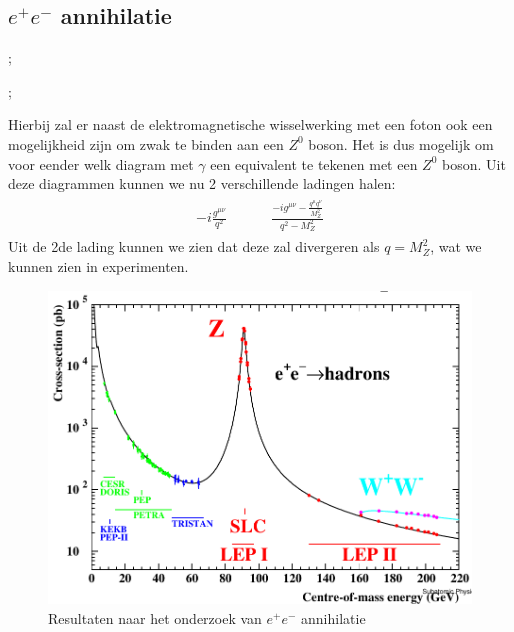 \documentclass[../main.tex]{subfiles}
\begin{document}
\subsection{$e^+e^-$ annihilatie}%
\label{sub:_e_e_annihilatie}

\begin{minipage}[c]{0.5\textwidth}
    \begin{center}
        ;
    \end{center}
\end{minipage}\noindent
\begin{minipage}[c]{0.5\textwidth}
    \begin{center}
        ;
    \end{center}
\end{minipage}
Hierbij zal er naast de elektromagnetische wisselwerking met een foton ook een mogelijkheid zijn om zwak te binden aan een $Z^0$ boson. Het is dus mogelijk om voor eender welk diagram met $\gamma$ een equivalent te tekenen met een $Z^0$ boson. Uit deze diagrammen kunnen we nu 2 verschillende ladingen halen:
\begin{equation}
    \begin{aligned}
        \label{eq:e+_e-_lading}
        \begin{matrix}
            -i\frac{g^{\mu\nu}}{q^2} &&&& \frac{-ig^{\mu\nu}- \frac{q^\mu q^\nu}{M_Z^2} }{q^2-M_Z^2}
        \end{matrix}
    \end{aligned}
\end{equation}
Uit de 2de lading kunnen we zien dat deze zal divergeren als $q=M_Z^2$, wat we kunnen zien in experimenten.

\begin{figure}[h]
    \centering
    \includegraphics[width=0.6\linewidth]{elektroweak_precision_tests/e+e-_annihilatie.png}
    \caption{Resultaten naar het onderzoek van $e^+e^-$ annihilatie}%
    \label{fig:elektroweak_precision_tests/e+e-_annihilatie}
\end{figure}
\end{document}
